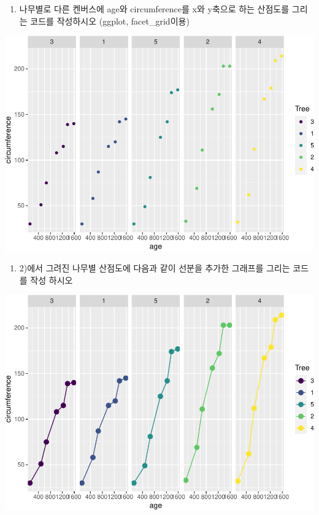 \documentclass[
]{book}
\providecommand{\tightlist}{%
  \setlength{\itemsep}{0pt}\setlength{\parskip}{0pt}}
\begin{document}
\begin{enumerate}
\def\labelenumi{\arabic{enumi})}
\setcounter{enumi}{1}
\tightlist
\item
  나무별로 다른 켄버스에 age와 circumference를 x와 y축으로 하는 산점도를 그리는 코드를 작성하시오 (ggplot, facet\_grid이용)
\end{enumerate}

\includegraphics{07-ggplot_files/figure-latex/unnamed-chunk-42-1.pdf}

\begin{enumerate}
\def\labelenumi{\arabic{enumi})}
\setcounter{enumi}{2}
\tightlist
\item
  2)에서 그려진 나무별 산점도에 다음과 같이 선분을 추가한 그래프를 그리는 코드를 작성 하시오
\end{enumerate}

\includegraphics{07-ggplot_files/figure-latex/unnamed-chunk-43-1.pdf}
\end{document}
